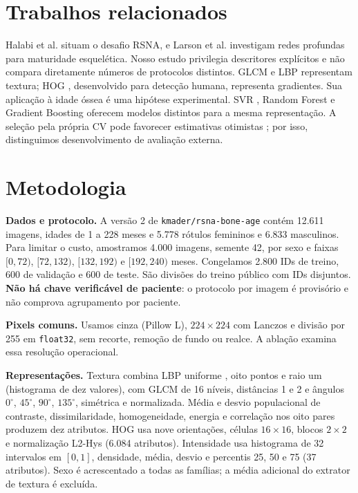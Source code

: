 \documentclass[12pt]{article}
\begin{document}
\section{Trabalhos relacionados}
Halabi et al. \cite{halabi} situam o desafio RSNA, e Larson et al. \cite{larson} investigam redes profundas para maturidade esquelética. Nosso estudo privilegia descritores explícitos e não compara diretamente números de protocolos distintos. GLCM \cite{haralick} e LBP \cite{ojala} representam textura; HOG \cite{dalal}, desenvolvido para detecção humana, representa gradientes. Sua aplicação à idade óssea é uma hipótese experimental. SVR \cite{smola}, Random Forest \cite{breiman} e Gradient Boosting \cite{friedman} oferecem modelos distintos para a mesma representação. A seleção pela própria CV pode favorecer estimativas otimistas \cite{varma}; por isso, distinguimos desenvolvimento de avaliação externa.
\newpage
\section{Metodologia}
\textbf{Dados e protocolo.} A versão 2 de \texttt{kmader/rsna-bone-age} contém 12.611 imagens, idades de 1 a 228 meses e 5.778 rótulos femininos e 6.833 masculinos. Para limitar o custo, amostramos 4.000 imagens, semente 42, por sexo e faixas $[0,72)$, $[72,132)$, $[132,192)$ e $[192,240)$ meses. Congelamos 2.800 IDs de treino, 600 de validação e 600 de teste. São divisões do treino público com IDs disjuntos. \textbf{Não há chave verificável de paciente}: o protocolo por imagem é provisório e não comprova agrupamento por paciente.

\textbf{Pixels comuns.} Usamos cinza (Pillow L), $224\times224$ com Lanczos e divisão por 255 em \texttt{float32}, sem recorte, remoção de fundo ou realce. A ablação examina essa resolução operacional.

\textbf{Representações.} Textura combina LBP uniforme \cite{ojala}, oito pontos e raio um (histograma de dez valores), com GLCM \cite{haralick} de 16 níveis, distâncias 1 e 2 e ângulos $0^\circ$, $45^\circ$, $90^\circ$, $135^\circ$, simétrica e normalizada. Média e desvio populacional de contraste, dissimilaridade, homogeneidade, energia e correlação nos oito pares produzem dez atributos. HOG \cite{dalal} usa nove orientações, células $16\times16$, blocos $2\times2$ e normalização L2-Hys (6.084 atributos). Intensidade usa histograma de 32 intervalos em $[0,1]$, densidade, média, desvio e percentis 25, 50 e 75 (37 atributos). Sexo é acrescentado a todas as famílias; a média adicional do extrator de textura é excluída.
\end{document}
